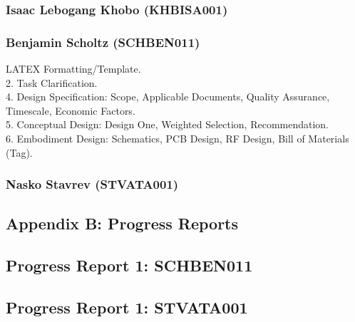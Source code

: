 \subsubsection*{Isaac Lebogang Khobo (KHBISA001)}
\subsubsection*{Benjamin Scholtz (SCHBEN011)}
LATEX Formatting/Template. \\
2. Task Clarification. \\
4. Design Specification: Scope, Applicable Documents, Quality Assurance, Timescale, Economic Factors. \\
5. Conceptual Design: Design One, Weighted Selection, Recommendation. \\
6. Embodiment Design: Schematics, PCB Design, RF Design, Bill of Materials (Tag). \\
\subsubsection*{Nasko Stavrev (STVATA001)}

\newpage
\vspace*{\fill}
\begin{center}
\subsection*{Appendix B: Progress Reports}
\end{center}
\vspace*{\fill}

\newpage
\vspace*{\fill}
\begin{center}
\subsection*{Progress Report 1: SCHBEN011}
\end{center}
\vspace*{\fill}


\newpage
\vspace*{\fill}
\begin{center}
\subsection*{Progress Report 1: STVATA001}
\end{center}
\vspace*{\fill}


